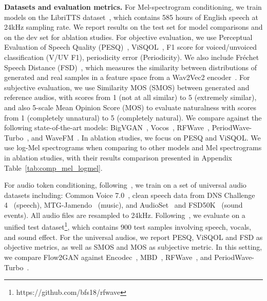 \documentclass{article} %
\begin{document}
\noindent\textbf{Datasets and evaluation metrics.} For Mel-spectrogram conditioning, we train models on the LibriTTS dataset~\citep{libritts}, which contains 585 hours of English speech at 24kHz sampling rate. 
We report results on the test set for model comparisons and on the dev set for ablation studies.
For objective evaluation, we use Perceptual Evaluation of Speech Quality (PESQ)~\citep{pesq}, ViSQOL~\citep{visqol}, F1 score for voiced/unvoiced classification (V/UV F1), periodicity error (Periodicity). We also include Fréchet Speech Distance (FSD)~\citep{voicebox}, which measures the similarity between distributions of generated and real samples in a feature space from a Wav2Vec2 encoder~\citep{wav2vec2}. 
For subjective evaluation, we use Similarity MOS (SMOS) between generated and reference audios, with scores from 1 (not at all similar) to 5 (extremely similar), and also 5-scale Mean Opinion Score (MOS) to evaluate naturalness with scores from 1 (completely unnatural) to 5 (completely natural). 
We compare against the following state-of-the-art models: BigVGAN~\citep{bigvgan}, Vocos~\citep{vocos}, RFWave~\citep{rfwave}, PeriodWave-Turbo~\citep{periodwave_turbo}, and WaveFM~\citep{wavefm}. In ablation studies, we focus on PESQ and ViSQOL. We use log-Mel spectrograms when comparing to other models and Mel spectrograms in ablation studies, with their results comparison presented in Appendix Table~\ref{tab:comp_mel_logmel}.

For audio token conditioning, following~\citep{mbd,rfwave}, we train on a set of universal audio datasets including: Common Voice 7.0~\citep{commonvoice}, clean speech data from DNS Challenge 4~\citep{dns} (speech), MTG-Jamendo~\citep{mtg} (music), and AudioSet~\citep{audioset} and FSD50K~\citep{fsd50k} (sound events). All audio files are resampled to 24kHz. Following~\citep{rfwave}, we evaluate on a unified test dataset\footnote{https://github.com/bfs18/rfwave}, which contains 900 test samples involving speech, vocals, and sound effect. 
For the universal audios, we report PESQ, ViSQOL and FSD as objective metrics, as well as SMOS and MOS as subjective metric. In this setting,  we compare Flow2GAN against Encodec~\citep{encodec}, MBD~\citep{mbd}, RFWave~\citep{rfwave}, and PeriodWave-Turbo~\citep{periodwave_turbo}. 

\end{document}
